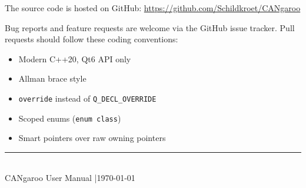 \documentclass[a4paper,11pt]{article}
\begin{document}
The source code is hosted on GitHub:
\url{https://github.com/Schildkroet/CANgaroo}

Bug reports and feature requests are welcome via the GitHub issue tracker.
Pull requests should follow these coding conventions:

\begin{itemize}
  \item Modern C++20, Qt6 API only
  \item Allman brace style
  \item \texttt{override} instead of \texttt{Q\_DECL\_OVERRIDE}
  \item Scoped enums (\texttt{enum class})
  \item Smart pointers over raw owning pointers
\end{itemize}

\vfill
\begin{center}
  \textcolor{canblue}{\rule{0.5\textwidth}{0.5pt}}\\[0.5em]
  {\small CANgaroo User Manual \quad|\quad \today}
\end{center}
\end{document}
